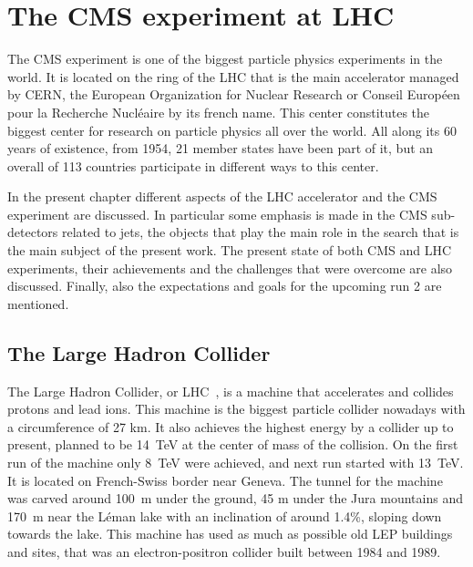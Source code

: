 \chapter[The CMS experiment at LHC]{The CMS experiment at LHC}

The CMS experiment is one of the biggest particle physics experiments in the world. It is located on the ring of the LHC that is the main accelerator managed by CERN, the European Organization for Nuclear Research or Conseil Europ\'{e}en pour la Recherche Nucl\'{e}aire by its french name. This center constitutes the biggest center for research on particle physics all over the world. All along its 60 years of existence, from 1954, 21 member states have been part of it, but an overall of 113 countries participate in different ways to this center. 

In the present chapter different aspects of the LHC accelerator and the CMS experiment are discussed. In particular some emphasis is made in the CMS sub-detectors related to jets, the objects that play the main role in the search that is the main subject of the present work. The present state of both CMS and LHC experiments, their achievements and the challenges that were overcome are also discussed. Finally, also the expectations and goals for the upcoming run 2 are mentioned.  

\section{The Large Hadron Collider}
\label{sec:LHC}

The Large Hadron Collider, or LHC~\cite{Bruning:782076}, is a machine that accelerates and collides protons and lead ions. This machine is the biggest particle collider nowadays with a circumference of 27 km. It also achieves the highest energy by a collider up to present, planned to be 14~TeV at the center of mass of the collision. On the first run of the machine only 8~TeV were achieved, and next run started with 13~TeV. It is located on French-Swiss border near Geneva. The tunnel for the machine was carved around 100~m under the ground, 45 m under the Jura mountains and 170~m near the L\'{e}man lake with an inclination of around 1.4\%, sloping down towards the lake. This machine has used as much as possible old LEP buildings and sites, that was an electron-positron collider built between 1984 and 1989. 

